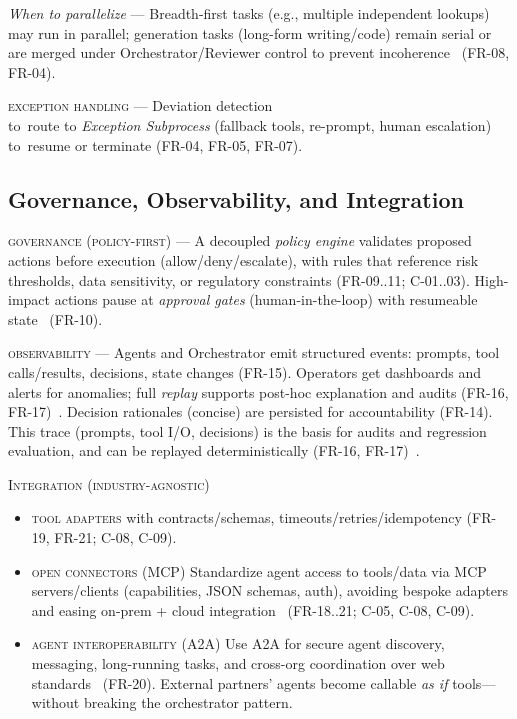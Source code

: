 \noindent \textit{When to parallelize} --- Breadth-first tasks (e.g., multiple independent lookups) may run in parallel; generation tasks (long-form writing/code) remain serial or are merged under Orchestrator/Reviewer control to prevent incoherence~\cite{langchain_multi_agents,cognition_dont_build} (\textsc{FR-08, FR-04}).

\textsc{exception handling} --- Deviation detection \\to\ route to \emph{Exception Subprocess} (fallback tools, re-prompt, human escalation) \\to\ resume or terminate (\textsc{FR-04, FR-05, FR-07}).

\subsection{Governance, Observability, and Integration}\label{sec:gov-obs-integ}
\textsc{governance (policy-first)} --- A decoupled \emph{policy engine} validates proposed actions before execution (allow/deny/escalate), with rules that reference risk thresholds, data sensitivity, or regulatory constraints (\textsc{FR-09..11; C-01..03}). High-impact actions pause at \emph{approval gates} (human-in-the-loop) with resumeable state~\parencite{langgraph_hil} (\textsc{FR-10}).

\textsc{observability} --- Agents and Orchestrator emit structured events: prompts, tool calls/results, decisions, state changes (\textsc{FR-15}). Operators get dashboards and alerts for anomalies; full \emph{replay} supports post-hoc explanation and audits (\textsc{FR-16, FR-17})~\parencite{langchain_multi_agents}. Decision rationales (concise) are persisted for accountability (\textsc{FR-14}). This trace (prompts, tool I/O, decisions) is the basis for audits and regression evaluation, and can be replayed deterministically (\textsc{FR-16, FR-17})~\parencite{langchain_multi_agents}.

\textsc{Integration (industry-agnostic)}
\begin{itemize}
  \item \textsc{tool adapters} with contracts/schemas, timeouts/retries/idempotency (\textsc{FR-19, FR-21; C-08, C-09}).
  \item \textsc{open connectors (MCP)} Standardize agent access to tools/data via MCP servers/clients (capabilities, JSON schemas, auth), avoiding bespoke adapters and easing on-prem + cloud integration~\parencite{anthropic_mcp} (\textsc{FR-18..21; C-05, C-08, C-09}).
  \item \textsc{agent interoperability (A2A)} Use A2A for secure agent discovery, messaging, long-running tasks, and cross-org coordination over web standards~\parencite{google_a2a} (\textsc{FR-20}). External partners' agents become callable \emph{as if} tools—without breaking the orchestrator pattern.
\end{itemize}

